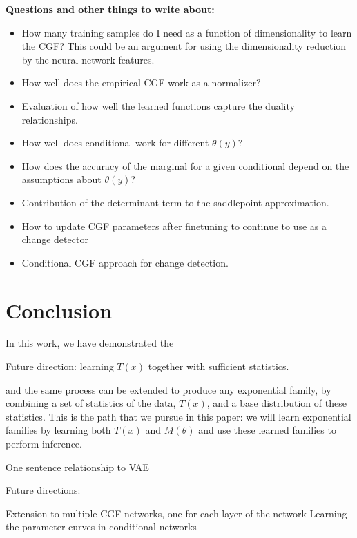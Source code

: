 \documentclass{article}      %
\begin{document}
\noindent \textbf{Questions and other things to write about:}
\begin{itemize}
  \item How many training samples do I need as a function of dimensionality to learn the CGF? This could be an argument for using the dimensionality reduction by the neural network features.
  \item How well does the empirical CGF work as a normalizer?
  \item Evaluation of how well the learned functions capture the duality relationships.
  \item How well does conditional work for different $\theta(y)$?
  \item How does the accuracy of the marginal for a given conditional depend on the assumptions about $\theta(y)$?
  \item Contribution of the determinant term to the saddlepoint approximation.
  \item How to update CGF parameters after finetuning to continue to use as a change detector
  \item Conditional CGF approach for change detection. 
\end{itemize}






\newpage




\section{Conclusion}

In this work, we have demonstrated the 


Future direction: learning $T(x)$ together with sufficient statistics.


and the same process can be extended to produce any exponential family, by combining a set of statistics of the data, $T(x)$, and a base distribution of these statistics.
This is the path that we pursue in this paper: we will learn exponential families by learning both $T(x)$ and $M(\theta)$ and use these learned families to perform inference.



One sentence relationship to VAE


Future directions:

Extension to multiple CGF networks, one for each layer of the network 
Learning the parameter curves in conditional networks
\end{document}
